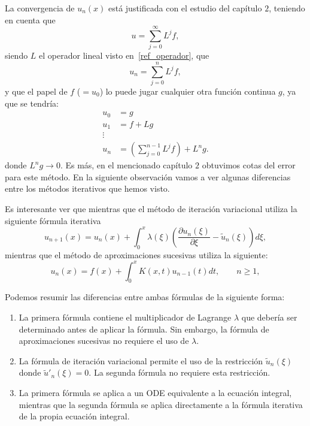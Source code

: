 La convergencia de $u_n(x)$ está justificada con el estudio del capítulo $2$, teniendo en cuenta que 
\begin{equation}
	u = \sum_{j=0}^{\infty}L^jf,
\end{equation}
siendo $L$ el operador lineal visto en~\eqref{ref_operador}, que 
\begin{equation}
	u_n = \sum_{j=0}^{n}L^jf,
\end{equation}
y que el papel de $f$ ($=u_0$) lo puede jugar cualquier otra función continua $g$, ya que se tendría:
\begin{align}
		u_0 &= g \\ u_1 &= f+Lg \\ \vdots \\ u_n &= (\sum_{j=0}^{n-1}L^jf)+L^ng.
\end{align}
donde $L^ng \rightarrow 0$. Es más, en el mencionado capítulo $2$ obtuvimos cotas del error para este método.
En la siguiente observación vamos a ver algunas diferencias entre los métodos iterativos que hemos visto.
\begin{observacion}
	Es interesante ver que mientras que el método de iteración variacional utiliza la siguiente fórmula iterativa
	\begin{equation}
		u_{n+1}(x) = u_n(x) + \int_{0}^{x} \lambda(\xi)(\dfrac{\partial u_n(\xi)}{\partial \xi}-\tilde{u}_n(\xi))d\xi,
	\end{equation}
	mientras que el método de aproximaciones sucesivas utiliza la siguiente:
	\begin{equation}
		u_n(x) = f(x) + \int_{0}^{x} K(x,t)u_{n-1}(t)dt, \qquad n \geqslant 1,
	\end{equation}
\end{observacion}
Podemos resumir las diferencias entre ambas fórmulas de la siguiente forma:
\begin{enumerate}
	\item La primera fórmula contiene el multiplicador de Lagrange $\lambda$ que debería ser determinado antes de aplicar la fórmula. Sin embargo, la fórmula de aproximaciones sucesivas no requiere el uso de $\lambda$.
	\item La fórmula de iteración variacional permite el uso de la restricción $\tilde{u}_n(\xi)$ donde $\tilde{u}'_n(\xi) = 0.$ La segunda fórmula no requiere esta restricción.
	\item La primera fórmula se aplica a un ODE equivalente a la ecuación integral, mientras que la segunda fórmula se aplica directamente a la fórmula iterativa de la propia ecuación integral.
\end{enumerate}

